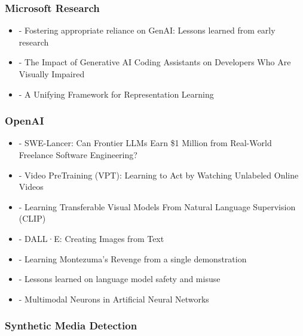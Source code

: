 \documentclass[
  letterpaper,
  DIV=11,
  numbers=noendperiod]{scrartcl}
\providecommand{\tightlist}{%
  \setlength{\itemsep}{0pt}\setlength{\parskip}{0pt}}
\begin{document}
\subsubsection{Microsoft Research}\label{microsoft-research}

\begin{itemize}
\tightlist
\item
  \autocite{vorvoreanu2025fostering} - Fostering appropriate reliance on
  GenAI: Lessons learned from early research
\item
  \autocite{flores-saviaga2025the} - The Impact of Generative AI Coding
  Assistants on Developers Who Are Visually Impaired
\item
  \autocite{alshammari2025a} - A Unifying Framework for Representation
  Learning
\end{itemize}

\subsubsection{OpenAI}\label{openai}

\begin{itemize}
\tightlist
\item
  \autocite{miserendino2025swelancerfrontierllmsearn} - SWE-Lancer: Can
  Frontier LLMs Earn \$1 Million from Real-World Freelance Software
  Engineering?
\item
  \autocite{baker2022videopretrainingvptlearning} - Video PreTraining
  (VPT): Learning to Act by Watching Unlabeled Online Videos
\item
  \autocite{radford2021learningtransferablevisualmodels} - Learning
  Transferable Visual Models From Natural Language Supervision (CLIP)
\item
  \autocite{openai2021dalle} - DALL·E: Creating Images from Text
\item
  \autocite{openai2018montezumasrevenge} - Learning Montezuma's Revenge
  from a single demonstration
\item
  \autocite{openai2022languagemodelsafety} - Lessons learned on language
  model safety and misuse
\item
  \autocite{goh2021multimodal} - Multimodal Neurons in Artificial Neural
  Networks
\end{itemize}

\subsubsection{Synthetic Media
Detection}\label{synthetic-media-detection}
\end{document}
